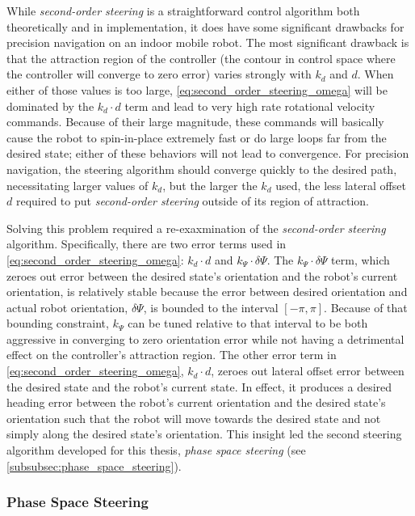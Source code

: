 While \emph{second-order steering} is a straightforward control algorithm both theoretically and in implementation, it does have some significant drawbacks for precision navigation on an indoor mobile robot. The most significant drawback is that the attraction region of the controller (the contour in control space where the controller will converge to zero error) varies strongly with $k_d$ and $d$. When either of those values is too large, \eqref{eq:second_order_steering_omega} will be dominated by the $k_d \cdot d$ term and lead to very high rate rotational velocity commands. Because of their large magnitude, these commands will basically cause the robot to spin-in-place extremely fast or do large loops far from the desired state; either of these behaviors will not lead to convergence. For precision navigation, the steering algorithm should converge quickly to the desired path, necessitating larger values of $k_d$, but the larger the $k_d$ used, the less lateral offset $d$ required to put \emph{second-order steering} outside of its region of attraction.

Solving this problem required a re-exaxmination of the \emph{second-order steering} algorithm. Specifically, there are two error terms used in \eqref{eq:second_order_steering_omega}: $k_d \cdot d$ and $k_{\Psi} \cdot \delta\Psi$. The $k_{\Psi} \cdot \delta\Psi$ term, which zeroes out error between the desired state's orientation and the robot's current orientation, is relatively stable because the error between desired orientation and actual robot orientation, $\delta\Psi$, is bounded to the interval $\left[-\pi,\pi\right]$. Because of that bounding constraint, $k_{\Psi}$ can be tuned relative to that interval to be both aggressive in converging to zero orientation error while not having a detrimental effect on the controller's attraction region. The other error term in \eqref{eq:second_order_steering_omega}, $k_d \cdot d$, zeroes out lateral offset error between the desired state and the robot's current state. In effect, it produces a desired heading error between the robot's current orientation and the desired state's orientation such that the robot will move towards the desired state and not simply along the desired state's orientation. This insight led the second steering algorithm developed for this thesis, \emph{phase space steering} (see \autoref{subsubsec:phase_space_steering}).

\subsubsection{Phase Space Steering}\label{subsubsec:phase_space_steering}

